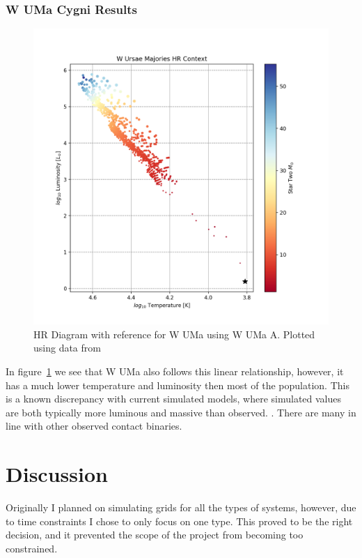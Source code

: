 \documentclass[12pt, a4paper]{article}
\begin{document}
        \subsubsection{W UMa Cygni Results}
            \begin{figure}[H]
                \centering
                \includegraphics[scale = .6]{figs/GeneratedFigs/W_UMa/WUMaHRDiagram.png}
                \caption{HR Diagram with reference for W UMa using W UMa A. Plotted using data from}
                \label{WUMaResults}
            \end{figure}

            In figure~\ref{WUMaResults} we see that W UMa also follows this linear relationship, however, it has a much lower temperature and luminosity then most of the population. This is a known discrepancy with current simulated models, where simulated values are both typically more luminous and massive than observed. \parencite{Fabry_2025}. There are many in line with other observed contact binaries.  



\section{\centering Discussion}   
    Originally I planned on simulating grids for all the types of systems, however, due to time constraints I chose to only focus on one type. This proved to be the right decision, and it prevented the scope of the project from becoming too constrained.
\end{document}
